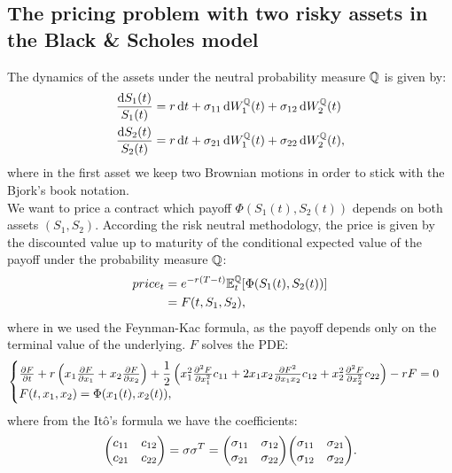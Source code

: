 \subsection[Pricing]{The pricing problem with two risky assets in the Black \& Scholes model}
The dynamics of the assets under the neutral probability measure $\mathbb{Q}$ is given by:
\begin{align}
    \dfrac{\dd S_1(t)}{S_1(t)} &= r\,\dd t + \sigma_{11}\,\dd W_1^{\mathbb{Q}}(t) + \sigma_{12}\,\dd W_2^{\mathbb{Q}}(t) \\
    \dfrac{\dd S_2(t)}{S_2(t)} &= r\,\dd t + \sigma_{21}\,\dd W_1^{\mathbb{Q}}(t) + \sigma_{22}\,\dd W_2^{\mathbb{Q}}(t),
\end{align}
where in the first asset we keep two Brownian motions in order to stick with the Bjork's book notation. \\
We want to price a contract which payoff $\Phi(S_1(t),S_2(t))$ depends on both assets $(S_1,S_2)$. According the risk neutral methodology, the price is given by the discounted value up to maturity of the conditional expected value of the payoff under the probability measure $\mathbb{Q}$:
\begin{align}
    price_t &= e^{-r(T-t)}\mathbb{E}^{\mathbb{Q}}_t[\Phi(S_1(t),S_2(t))] \\
    &=
    F(t,S_1,S_2),
\end{align}
where in we used the Feynman-Kac formula, as the payoff depends only on the terminal value of the underlying. $F$ solves the PDE: %
\begin{equation}\label{bspdee}
    \begin{cases}
    \pdv{F}{t} + r\left(x_1\pdv{F}{x_1} + x_2\pdv{F}{x_2}\right) + \dfrac{1}{2}\left(x_1^2\pdv[2]{F}{x_1}c_{11} + 2x_1x_2\pdv{F^2}{x_1x_2}c_{12} + x_2^2\pdv[2]{F}{x_2}c_{22}\right) - rF = 0 \\
    F(t,x_1,x_2) = \Phi(x_1(t),x_2(t)),
    \end{cases}
\end{equation}
where from the Itô's formula we have the coefficients:
\begin{equation}
    \mqty(c_{11}&c_{12}\\c_{21}&c_{22}) = \sigma\sigma^T = \mqty(\sigma_{11}&\sigma_{12}\\\sigma_{21}&\sigma_{22})\mqty(\sigma_{11}&\sigma_{21}\\\sigma_{12}&\sigma_{22}).
\end{equation}

